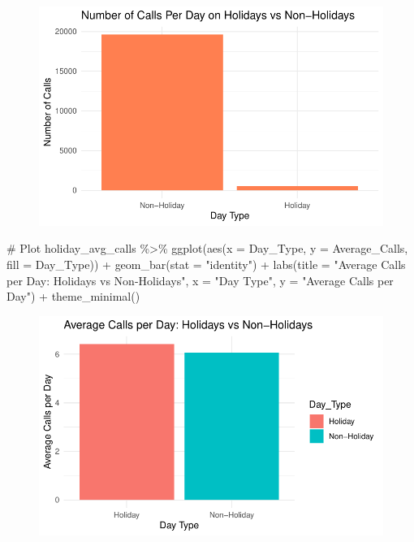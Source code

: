 \documentclass[
  letterpaper,
  DIV=11,
  numbers=noendperiod]{scrartcl}
\newenvironment{Shaded}{\begin{snugshade}}{\end{snugshade}}
\newcommand{\AttributeTok}[1]{\textcolor[rgb]{0.40,0.45,0.13}{#1}}
\newcommand{\CommentTok}[1]{\textcolor[rgb]{0.37,0.37,0.37}{#1}}
\newcommand{\FunctionTok}[1]{\textcolor[rgb]{0.28,0.35,0.67}{#1}}
\newcommand{\NormalTok}[1]{\textcolor[rgb]{0.00,0.23,0.31}{#1}}
\newcommand{\SpecialCharTok}[1]{\textcolor[rgb]{0.37,0.37,0.37}{#1}}
\newcommand{\StringTok}[1]{\textcolor[rgb]{0.13,0.47,0.30}{#1}}
\begin{document}
\begin{figure}[H]

{\centering \includegraphics{Report_files/figure-pdf/unnamed-chunk-6-1.pdf}

}

\end{figure}

\begin{Shaded}
\begin{Highlighting}[]
\CommentTok{\# Plot}
\NormalTok{holiday\_avg\_calls }\SpecialCharTok{\%\textgreater{}\%}
  \FunctionTok{ggplot}\NormalTok{(}\FunctionTok{aes}\NormalTok{(}\AttributeTok{x =}\NormalTok{ Day\_Type, }\AttributeTok{y =}\NormalTok{ Average\_Calls, }\AttributeTok{fill =}\NormalTok{ Day\_Type)) }\SpecialCharTok{+}
  \FunctionTok{geom\_bar}\NormalTok{(}\AttributeTok{stat =} \StringTok{"identity"}\NormalTok{) }\SpecialCharTok{+}
  \FunctionTok{labs}\NormalTok{(}\AttributeTok{title =} \StringTok{"Average Calls per Day: Holidays vs Non{-}Holidays"}\NormalTok{, }\AttributeTok{x =} \StringTok{"Day Type"}\NormalTok{, }\AttributeTok{y =} \StringTok{"Average Calls per Day"}\NormalTok{) }\SpecialCharTok{+}
  \FunctionTok{theme\_minimal}\NormalTok{()}
\end{Highlighting}
\end{Shaded}

\begin{figure}[H]

{\centering \includegraphics{Report_files/figure-pdf/unnamed-chunk-6-2.pdf}

}

\end{figure}
\end{document}

